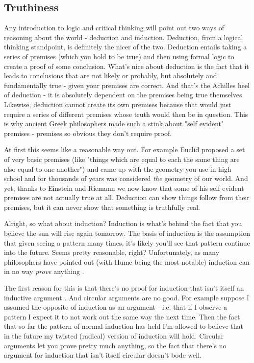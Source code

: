 \documentclass[11pt,a5paper]{book}
\begin{document}
\subsection{Truthiness}
Any introduction to logic and critical thinking will point out two ways of reasoning about the world - deduction and induction. Deduction, from a logical thinking standpoint, is definitely the nicer of the two. Deduction entails taking a series of premises (which you hold to be true) and then using formal logic to create a proof of some conclusion. What's nice about deduction is the fact that it leads to conclusions that are not likely or probably, but absolutely and fundamentally true - given your premises are correct. And that's the Achilles heel of deduction - it is absolutely dependent on the premises being true themselves. Likewise, deduction cannot create its own premises because that would just require a series of different premises whose truth would then be in question. This is why ancient Greek philosophers made such a stink about "self evident" premises - premises so obvious they don't require proof. 
\newline

At first this seems like a reasonable way out. For example Euclid proposed a set of very basic premises (like "things which are equal to each the same thing are also equal to one another") and came up with the geometry you use in high school and for thousands of years was considered \textit{the} geometry of our world. And yet, thanks to Einstein and Riemann we now know that some of his self evident premises are not actually true at all. Deduction can show things follow from their premises, but it can never show that something is truthfully real.
\newline

Alright, so what about induction? Induction is what's behind the fact that you believe the sun will rise again tomorrow. The basis of induction is the assumption that given seeing a pattern many times, it's likely you'll see that pattern continue into the future. Seems pretty reasonable, right? Unfortunately, as many philosophers have pointed out (with Hume being the most notable) induction can in no way \textit{prove} anything \cite{lipton}.
\newline

The first reason for this is that there's no proof for induction that isn't itself an inductive argument \cite{lipton}. And circular arguments are no good. For example suppose I assumed the opposite of induction as an argument - i.e. that if I observe a pattern I expect it to not work out the same way the next time. Then the fact that so far the pattern of normal induction has held I'm allowed to believe that in the future my twisted (radical) version of induction will hold. Circular arguments let you prove pretty much anything, so the fact that there's no argument for induction that isn't itself circular doesn't bode well.
\newline
\end{document}
